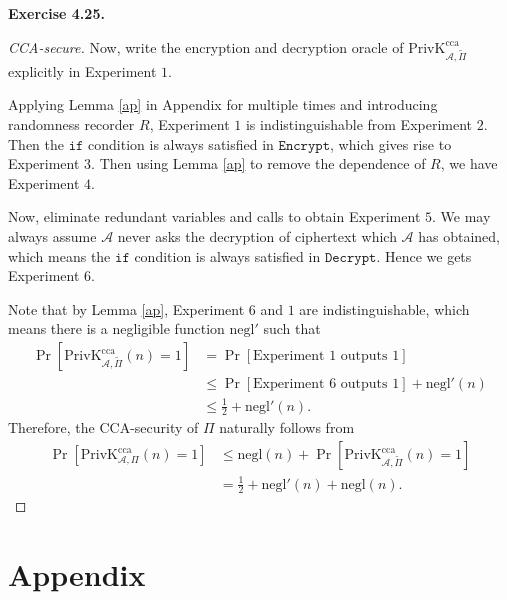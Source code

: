 \documentclass[a4paper]{article}
\newtheorem*{proof}{Proof}
\newenvironment{exercise}[1]{
	\par
	\noindent\textbf{Exercise #1.}\quad
}{
	\par
	\bigskip
}
\newcommand{\sbra}[1]{\left[ #1 \right]}
\newcommand{\PrivK}{\mathrm{PrivK}}
\newcommand{\negl}{\mathrm{negl}}
\newcommand{\cca}{\mathrm{cca}}
\begin{document}
\begin{exercise}{4.25}
\begin{proof}[CCA-secure]
    Now, write the encryption and decryption oracle of $\PrivK_{\mathcal A,\widetilde\Pi}^\cca$ explicitly 
    in Experiment $1$.

    

    Applying Lemma \ref{ap} in Appendix for multiple times and introducing randomness recorder $R$, 
    Experiment $1$ is indistinguishable from Experiment $2$.
    Then the $\mathtt{if}$ condition is always satisfied in $\mathtt{Encrypt}$, which gives rise to 
    Experiment $3$. Then using Lemma \ref{ap} to remove the dependence of $R$, we have Experiment $4$.

    

    Now, eliminate redundant variables and calls to obtain Experiment $5$.
    We may always assume $\mathcal A$ never asks the decryption of ciphertext which $\mathcal A$ has obtained,
    which means the $\mathtt{if}$ condition is always satisfied in $\mathtt{Decrypt}$.
    Hence we gets Experiment $6$.

    

    Note that by Lemma \ref{ap}, Experiment $6$ and $1$ are indistinguishable, which means there is a negligible function
    $\negl'$ such that
    \begin{align*}
        \Pr\sbra{\PrivK_{\mathcal A,\widetilde\Pi}^\cca(n)=1}&=\Pr\sbra{\text{Experiment $1$ outputs $1$}}\\
        &\leq\Pr\sbra{\text{Experiment $6$ outputs $1$}}+\negl'(n)\\
        &\leq\frac12+\negl'(n).
    \end{align*}
    Therefore, the CCA-security of $\Pi$ naturally follows from
    \begin{align*}
        \Pr\sbra{\PrivK_{\mathcal A,\Pi}^\cca(n)=1}
        &\leq\negl(n)+\Pr\sbra{\PrivK_{\mathcal A,\widetilde\Pi}^\cca(n)=1}\\
        &=\frac12+\negl'(n)+\negl(n).
    \end{align*}
\end{proof}
\end{exercise}

\newpage
\section*{Appendix}
\end{document}
